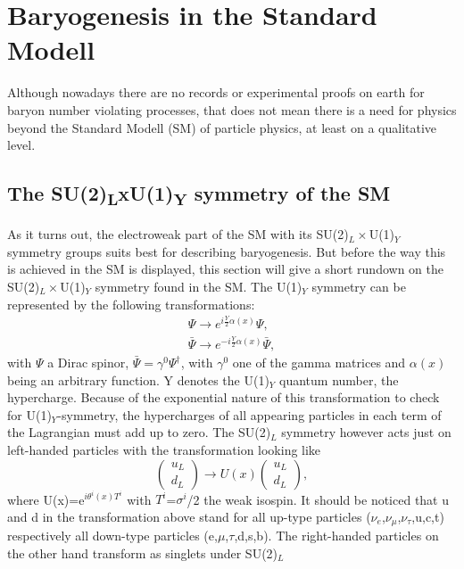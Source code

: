 \section{Baryogenesis in the Standard Modell}
Although nowadays there are no records or experimental proofs on earth for baryon number violating processes, that does not mean there is a need for physics beyond the Standard Modell (SM) of particle physics, at least on a qualitative level.
\subsection{The SU(2)\textsubscript{L}xU(1)\textsubscript{Y} symmetry of the SM}
As it turns out, the electroweak part of the SM with its SU(2)$_L\times$U(1)$_Y$ symmetry groups suits best for describing baryogenesis. But before the way this is achieved in the SM is displayed, this section will give a short rundown on the SU(2)$_L\times$U(1)$_Y$ symmetry found in the SM.\newline\indent
The U(1)$_Y$ symmetry can be represented by the following transformations:
\begin{align*}
\Psi \longrightarrow e^{i\frac{Y}{2}\alpha(x)}\Psi,\\
\bar{\Psi} \longrightarrow e^{-i\frac{Y}{2}\alpha(x)}\bar{\Psi},
\end{align*}
with $\Psi$ a Dirac spinor, $\bar{\Psi}=\gamma^0\Psi^\dagger$, with $\gamma^0$ one of the gamma matrices and $\alpha(x)$ being an arbitrary function. Y denotes the U(1)$_Y$ quantum number, the hypercharge. Because of the exponential nature of this transformation to check for U(1)$_Y$-symmetry, the hypercharges of all appearing particles in each term of the Lagrangian must add up to zero. \newline\indent
The SU(2)$_L$ symmetry however acts just on left-handed particles with the transformation looking like
\begin{equation*}
	\left(\begin{array}{c}u_L\\d_L\end{array}\right)\longrightarrow U(x)	\left(\begin{array}{c}u_L\\d_L\end{array}\right),
\end{equation*}
where U(x)=e$^{i\theta^i(x)T^i}$ with $T^i$=$\sigma^i$/2 the weak isospin. It should be noticed that u and d in the transformation above stand for all up-type particles ($\nu_e$,$\nu_\mu$,$\nu_\tau$,u,c,t) respectively all down-type particles (e,$\mu$,$\tau$,d,s,b). The right-handed particles on the other hand transform as singlets under SU(2)$_L$
